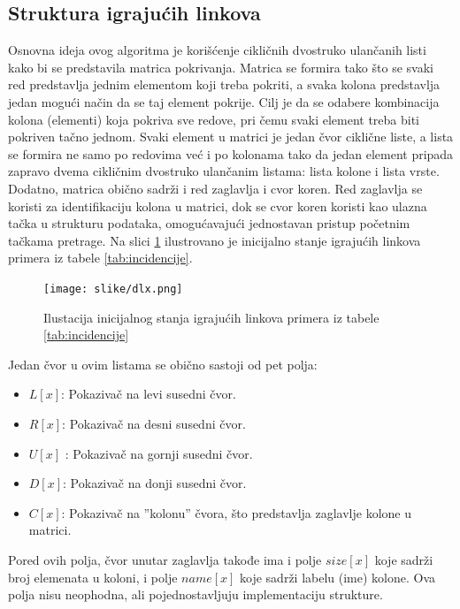 \documentclass[a4paper]{article}
\begin{document}
{\subsection{Struktura igrajućih linkova}
Osnovna ideja ovog algoritma je korišćenje cikličnih dvostruko ulančanih listi kako bi se predstavila
matrica pokrivanja. Matrica se formira tako što se svaki red predstavlja jednim elementom koji treba
pokriti, a svaka kolona predstavlja jedan mogući način da se taj element pokrije. Cilj je da se odabere
kombinacija kolona (elementi) koja pokriva sve redove, pri čemu svaki element treba biti pokriven tačno
jednom. Svaki element u matrici je jedan čvor ciklične liste, a lista se formira ne samo po redovima već
i po kolonama tako da jedan element pripada zapravo dvema cikličnim dvostruko ulančanim listama: lista
kolone i lista vrste. Dodatno, matrica obično sadrži i red zaglavlja i cvor koren. Red zaglavlja se
koristi za identifikaciju kolona u matrici, dok se cvor koren koristi kao ulazna tačka u strukturu
podataka, omogućavajući jednostavan pristup početnim tačkama pretrage. Na slici \ref{fig:dlx} ilustrovano
je inicijalno stanje igrajućih linkova primera iz tabele \ref{tab:incidencije}.

\begin{figure}[h!]
  \begin{center}
  \texttt{[image: slike/dlx.png]}
  \end{center}
  \caption{Ilustacija inicijalnog stanja igrajućih linkova primera iz tabele \ref{tab:incidencije}} \cite{dancing_links_visualized}
  \label{fig:dlx}
\end{figure}

Jedan čvor u ovim listama se obično sastoji od pet polja:
\begin{itemize}
  \item \( L[x] \): Pokazivač na levi susedni čvor.
  \item \( R[x] \): Pokazivač na desni susedni čvor.
  \item \( U[x] \) : Pokazivač na gornji susedni čvor.
  \item \( D[x] \): Pokazivač na donji susedni čvor.
  \item \( C[x] \): Pokazivač na ''kolonu'' čvora, što predstavlja zaglavlje kolone u matrici.
\end{itemize}

Pored ovih polja, čvor unutar zaglavlja takođe ima i polje \( size[x] \) koje sadrži broj elemenata u
koloni, i polje \( name[x] \) koje sadrži labelu (ime) kolone. Ova polja nisu neophodna, ali pojednostavljuju
implementaciju strukture.

}
\end{document}
